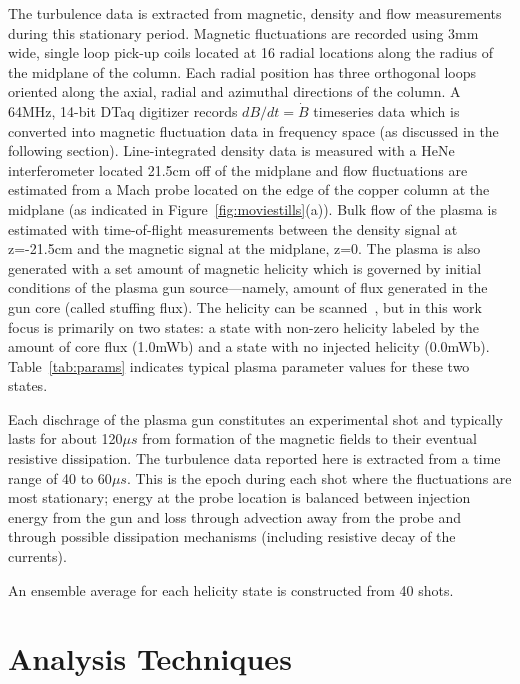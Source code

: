 \documentclass[aip,prl,amsmath,amssymb,reprint,superscriptaddress]{revtex4-1} %
\begin{document}
The turbulence data is extracted from magnetic, density and flow measurements during this stationary period. Magnetic fluctuations are recorded using 3mm wide, single loop pick-up coils located at 16 radial locations along the radius of the midplane of the column. Each radial position has three orthogonal loops oriented along the axial, radial and azimuthal directions of the column. A 64MHz, 14-bit DTaq digitizer records $dB/dt = \dot{B}$ timeseries data which is converted into magnetic fluctuation data in frequency space (as discussed in the following section). Line-integrated density data is measured with a HeNe interferometer located 21.5cm off of the midplane and flow fluctuations are estimated from a Mach probe located on the edge of the copper column at the midplane (as indicated in Figure~\ref{fig:moviestills}(a)). Bulk flow of the plasma is estimated with time-of-flight measurements between the density signal at z=-21.5cm and the magnetic signal at the midplane, z=0. The plasma is also generated with a set amount of magnetic helicity which is governed by initial conditions of the plasma gun source---namely, amount of flux generated in the gun core (called stuffing flux). The helicity can be scanned~\cite{schaffner14b}, but in this work focus is primarily on two states: a state with non-zero helicity labeled by the amount of core flux (1.0mWb) and a state with no injected helicity (0.0mWb). Table~\ref{tab:params} indicates typical plasma parameter values for these two states.

Each dischrage of the plasma gun constitutes an experimental shot and typically lasts for about 120$\mu s$ from formation of the magnetic fields to their eventual resistive dissipation. The turbulence data reported here is extracted from a time range of 40 to 60$\mu s$. This is the epoch during each shot where the fluctuations are most stationary; energy at the probe location is balanced between injection energy from the gun and loss through advection away from the probe and through possible dissipation mechanisms (including resistive decay of the currents).

An ensemble average for each helicity state is constructed from 40 shots.

\section{Analysis Techniques}
\end{document}
